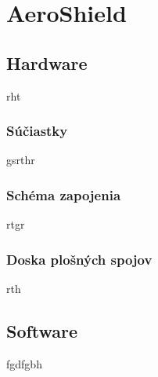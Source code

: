 \chapter{AeroShield}

\section{Hardware}
rht
\subsection{Súčiastky}
gsrthr
\subsection{Schéma zapojenia}
rtgr
\subsection{Doska plošných spojov}
rth
\section{Software}
fgdfgbh 